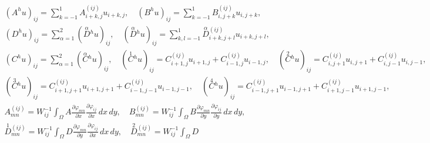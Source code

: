 \begin{gather*}


(A^hu)_{ij}=\sum_{k=-1}^1A_{i+k,j}^{(ij)}u_{i+k,j},\quad


(B^hu)_{ij}=\sum_{k=-1}^1B_{i,j+k}^{(ij)}u_{i,j+k}, \\


%


(D^hu)_{ij}=\sum_{\alpha=1}^2(\overset{\alpha}{D}{}^hu)_{ij},\quad


(\overset{\alpha}{D}{}^hu)_{ij}=\sum_{k,l=-1}^1


\overset{\alpha}{D}{}^{(ij)}_{i+k,j+l}u_{i+k,j+l}, \\


%


(C^hu)_{ij}=\sum_{\alpha=1}^2(\overset{\alpha}{C}{}^hu)_{ij},\quad


(\overset{1}{C}{}^hu)_{ij}=C_{i+1,j}^{(ij)}u_{i+1,j}+


C_{i-1,j}^{(ij)}u_{i-1,j},\quad


(\overset{2}{C}{}^hu)_{ij}=C_{i,j+1}^{(ij)}u_{i,j+1}+


C_{i,j-1}^{(ij)}u_{i,j-1}, \\


%


(\overset{3}{C}{}^hu)_{ij}=C_{i+1,j+1}^{(ij)}u_{i+1,j+1}+


C_{i-1,j-1}^{(ij)}u_{i-1,j-1},\quad


(\overset{4}{C}{}^hu)_{ij}=C_{i-1,j+1}^{(ij)}u_{i-1,j+1}+


C_{i+1,j-1}^{(ij)}u_{i+1,j-1}, \\


%


A_{mn}^{(ij)}=W_{ij}^{-1}\int_{\Omega}A\frac{\partial\varphi_{mn}}{


\partial x}\frac{\partial\varphi_{ij}}{\partial x}\,dx\,dy,\quad


B_{mn}^{(ij)}=W_{ij}^{-1}\int_{\Omega}B\frac{\partial\varphi_{mn}}{


\partial y}\frac{\partial\varphi_{ij}}{\partial y}\,dx\,dy, \\


%


\overset{1}{D}{}^{(ij)}_{mn}=W_{ij}^{-1}\int_{\Omega}D


\frac{\partial\varphi_{mn}}{\partial y}\frac{\partial\varphi_{ij}}{


\partial x}\,dx\,dy,\quad


\overset{2}{D}{}^{(ij)}_{mn}=W_{ij}^{-1}\int_{\Omega}D



\end{gather*}
